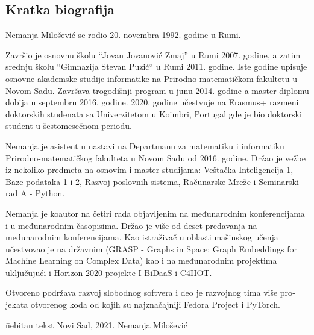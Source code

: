 \documentclass[b5paper]{book}
\begin{document}
\begin{otherlanguage}{english}
\chapter{Kratka biografija}

Nemanja Milošević se rodio 20. novembra 1992. godine u Rumi.

Završio je osnovnu školu ``Jovan Jovanović Zmaj'' u Rumi 2007. godine, a zatim srednju školu ``Gimnazija Stevan Puzić`` u Rumi 2011. godine. Iste godine upisuje osnovne akademske studije informatike na Prirodno-matematičkom fakultetu u Novom Sadu. Završava trogodišnji program u junu 2014. godine a master diplomu dobija u septembru 2016. godine. 2020. godine učestvuje na Erasmus+ razmeni doktorskih studenata sa Univerzitetom u Koimbri, Portugal gde je bio doktorski student u šestomesečnom periodu.

Nemanja je asistent u nastavi na Departmanu za matematiku i informatiku Prirodno-matematičkog fakulteta u Novom Sadu od 2016. godine. Držao je vežbe iz nekoliko predmeta na osnovim i master studijama: Veštačka Inteligencija 1, Baze podataka 1 i 2, Razvoj poslovnih sistema, Računarske Mreže i Seminarski rad A - Python.

Nemanja je koautor na četiri rada objavljenim na međunarodnim konferencijama i u međunarodnim časopisima. Držao je više od deset predavanja na međunarodnim konferencijama. Kao istraživač u oblasti mašinskog učenja učestvovao je na državnim (GRASP - Graphs in Space: Graph Embeddings for Machine Learning on Complex Data) kao i na međunarodnim projektima uključujući i Horizon 2020 projekte I-BiDaaS i C4IIOT.

Otvoreno podržava razvoj slobodnog softvera i deo je razvojnog tima više projekata otvorenog koda od kojih su najznačajniji Fedora Project i PyTorch.

\vfill


\begin{tabbing}
  \hspace{0.7\textwidth} \= nebitan tekst \kill
  Novi Sad, 2021. \> Nemanja Milošević\\
  \\
  \> \makebox[0.3\textwidth]{\dotfill}
\end{tabbing}

\end{otherlanguage}


\end{document}
